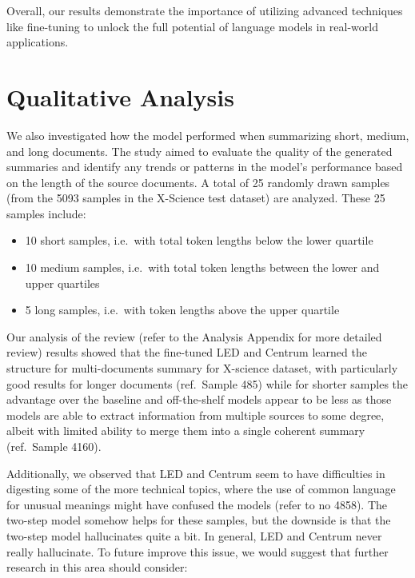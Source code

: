 \documentclass[12pt, twocolumn]{article}
\numberwithin{equation}{section}
\begin{document}
Overall, our results demonstrate the importance of utilizing advanced techniques like fine-tuning to unlock the full potential of language models in real-world applications.

\section{Qualitative Analysis}
\label{app:qualitative}

We also investigated how the model performed when summarizing short, medium, and long documents. The study aimed to evaluate the quality of the generated summaries and identify any trends or patterns in the model's performance based on the length of the source documents. A total of 25 randomly drawn samples (from the 5093 samples in the X-Science test dataset) are analyzed.  These 25 samples include:

\begin{itemize}
    \item 10 short samples, i.e.~with total token lengths below the lower quartile
    \item 10 medium samples, i.e.~with total token lengths between the lower and upper quartiles
    \item 5 long samples, i.e.~with token lengths above the upper quartile
\end{itemize}

Our analysis of the review (refer to the Analysis Appendix for more detailed review) results showed that the fine-tuned LED and Centrum learned the structure for multi-documents summary for X-science dataset, with particularly good results for longer documents (ref.~Sample 485) while for shorter samples the advantage over the baseline and off-the-shelf models appear to be less as those models are able to extract information from multiple sources to some degree, albeit with limited ability to merge them into a single coherent summary (ref.~Sample 4160). 

Additionally, we observed that LED and Centrum seem to have difficulties in digesting some of the more technical topics, where the use of common language for unusual meanings might have confused the models (refer to no 4858).  The two-step model somehow helps for these samples, but the downside is that the two-step model hallucinates quite a bit. In general, LED and Centrum never really hallucinate. To future improve this issue, we would suggest that further research in this area should consider:
\end{document}
